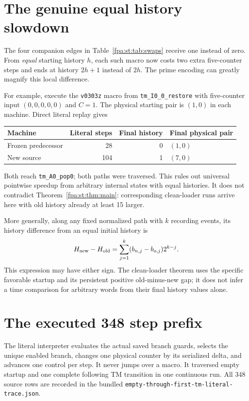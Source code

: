 \documentclass[11pt,a4paper]{article}
\numberwithin{equation}{section}
\newcommand{\code}[1]{\texttt{\small #1}}
\begin{document}
\section{The genuine equal history slowdown}
\label{fpa:st:sec:tradeoff}
The four companion edges in Table~\ref{fpa:st:tab:swaps} receive one instead of
zero. From \emph{equal} starting history $h$, each such macro now costs two
extra five-counter steps and ends at history $2h+1$ instead of $2h$. The
prime encoding can greatly magnify this local difference.

For example, execute the \code{v0303z} macro from
\code{tm\_I0\_0\_restore} with five-counter input $(0,0,0,0,0)$ and $C=1$.
The physical starting pair is $(1,0)$ in each machine. Direct literal replay
gives
\begin{center}
\begin{tabular}{@{}lrrl@{}}
\toprule
Machine & Literal steps & Final history & Final physical pair\\
\midrule
Frozen predecessor & 28 & 0 & $(1,0)$\\
New source & 104 & 1 & $(7,0)$\\
\bottomrule
\end{tabular}
\end{center}
Both reach \code{tm\_A0\_pop0}; both paths were traversed. This rules out
universal pointwise speedup from arbitrary internal states with equal
histories. It does not contradict Theorem~\ref{fpa:st:thm:main}: corresponding
clean-loader runs arrive here with old history already at least 15 larger.

More generally, along any fixed normalized path with $k$ recording events,
its history difference from an equal initial history is
\begin{equation}
 H_{\rm new}-H_{\rm old}
 =\sum_{j=1}^{k}(b_{n,j}-b_{o,j})2^{k-j}.
 \label{fpa:st:eq:arbitraryword}
\end{equation}
This expression may have either sign. The clean-loader theorem uses the
specific favorable startup and its persistent positive old-minus-new gap;
it does not infer a time comparison for arbitrary words from their final
history values alone.

\section{The executed 348 step prefix}
\label{fpa:st:sec:trace}
The literal interpreter evaluates the actual saved branch guards, selects
the unique enabled branch, changes one physical counter by its serialized
delta, and advances one control per step. It never jumps over a macro.
It traversed empty startup and one complete following TM transition in one
continuous run. All 348 source rows are recorded in the bundled
\code{empty-through-first-tm-literal-trace.json}.
\end{document}

